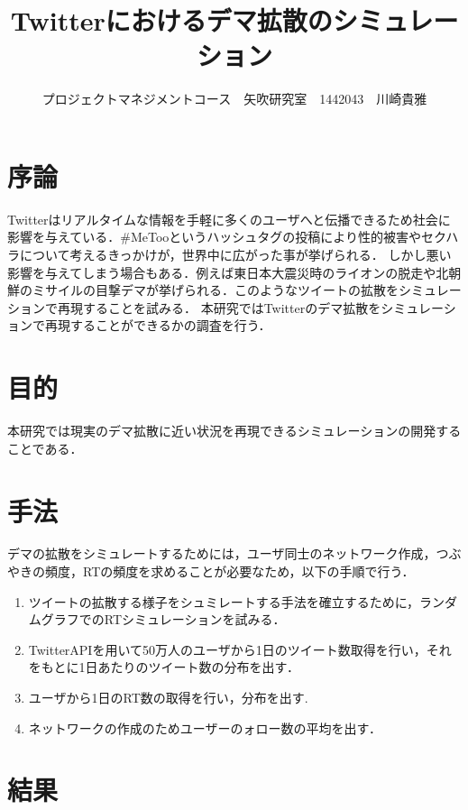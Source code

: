 \documentclass[uplatex,twocolumn,dvipdfmx]{jsarticle}
\title{\vspace{-5mm}\fontsize{14pt}{0pt}\selectfont Twitterにおけるデマ拡散のシミュレーション}
\author{\normalsize プロジェクトマネジメントコース　矢吹研究室　1442043　川崎貴雅}
\date{}
\begin{document}
\fontsize{10.5pt}{\baselineskip}\selectfont
\maketitle



\section{序論}\label{序論}

Twitterはリアルタイムな情報を手軽に多くのユーザへと伝播できるため社会に影響を与えている．\#MeTooというハッシュタグの投稿により性的被害やセクハラについて考えるきっかけが，世界中に広がった事が挙げられる．
しかし悪い影響を与えてしまう場合もある．例えば東日本大震災時のライオンの脱走や北朝鮮のミサイルの目撃デマが挙げられる．このようなツイートの拡散をシミュレーションで再現することを試みる．
本研究ではTwitterのデマ拡散をシミュレーションで再現することができるかの調査を行う．

\section{目的}

本研究では現実のデマ拡散に近い状況を再現できるシミュレーションの開発することである．

\section{手法}

デマの拡散をシミュレートするためには，ユーザ同士のネットワーク作成，つぶやきの頻度，RTの頻度を求めることが必要なため，以下の手順で行う．
\begin{enumerate}
\item ツイートの拡散する様子をシュミレートする手法を確立するために，ランダムグラフでのRTシミュレーションを試みる\cite{netto}．
\item TwitterAPIを用いて50万人のユーザから1日のツイート数取得を行い，それをもとに1日あたりのツイート数の分布を出す．
\item ユーザから1日のRT数の取得を行い，分布を出す.
\item ネットワークの作成のためユーザーのォロー数の平均を出す．
\end{enumerate}

\section{結果}
\end{document}
